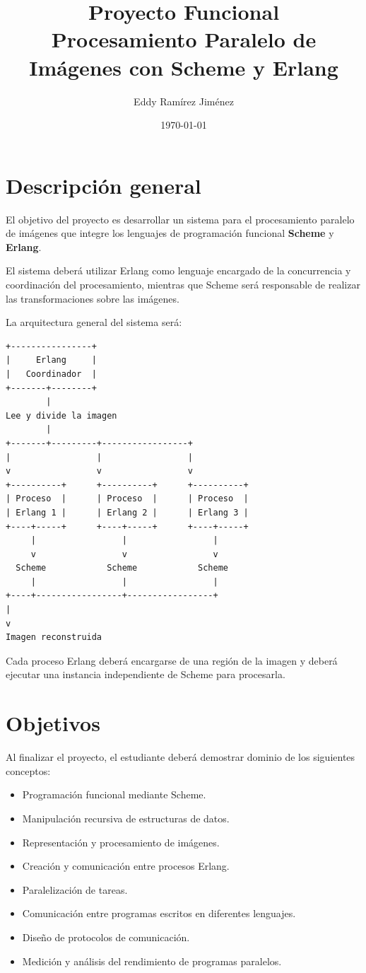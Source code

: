 \documentclass[11pt,a4paper]{article}
\title{\textbf{Proyecto Funcional}\\ Procesamiento Paralelo de Imágenes con Scheme y Erlang}
\author{Eddy Ramírez Jiménez}
\date{\today}
\begin{document}
\maketitle

\section{Descripción general}

El objetivo del proyecto es desarrollar un sistema para el procesamiento
paralelo de imágenes que integre los lenguajes de programación funcional
\textbf{Scheme} y \textbf{Erlang}.

El sistema deberá utilizar Erlang como lenguaje encargado de la
concurrencia y coordinación del procesamiento, mientras que Scheme será
responsable de realizar las transformaciones sobre las imágenes.

La arquitectura general del sistema será:

\begin{center}
\begin{verbatim}
+----------------+
|     Erlang     |
|   Coordinador  |
+-------+--------+
        |
Lee y divide la imagen
        |
+-------+---------+-----------------+
|                 |                 |
v                 v                 v
+----------+      +----------+      +----------+
| Proceso  |      | Proceso  |      | Proceso  |
| Erlang 1 |      | Erlang 2 |      | Erlang 3 |
+----+-----+      +----+-----+      +----+-----+
     |                 |                 |
     v                 v                 v
  Scheme            Scheme            Scheme
     |                 |                 |
+----+-----------------+-----------------+
|
v
Imagen reconstruida
\end{verbatim}
\end{center}

Cada proceso Erlang deberá encargarse de una región de la imagen y
deberá ejecutar una instancia independiente de Scheme para procesarla.

\section{Objetivos}

Al finalizar el proyecto, el estudiante deberá demostrar dominio de los
siguientes conceptos:

\begin{itemize}
\item Programación funcional mediante Scheme.
\item Manipulación recursiva de estructuras de datos.
\item Representación y procesamiento de imágenes.
\item Creación y comunicación entre procesos Erlang.
\item Paralelización de tareas.
\item Comunicación entre programas escritos en diferentes lenguajes.
\item Diseño de protocolos de comunicación.
\item Medición y análisis del rendimiento de programas paralelos.
\end{itemize}
\end{document}
